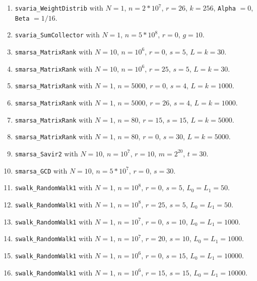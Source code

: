 \begin{enumerate}
  \item {\tt svaria\_WeightDistrib} with $N=1$, $n=2*10^7$, $r=26$, $k=256$,
   {\tt Alpha} $=0$,  {\tt Beta} $=1/16$.

  \item {\tt svaria\_SumCollector} with $N=1$, $n=5*10^8$, $r=0$,  $g=10$.

  \item {\tt smarsa\_MatrixRank} with $N=10$, $n=10^6$, $r=0$,
   $s=5$, $L=k=30$.

  \item {\tt smarsa\_MatrixRank} with $N=10$, $n=10^6$, $r=25$,
   $s=5$, $L=k=30$.

  \item {\tt smarsa\_MatrixRank} with $N=1$, $n=5000$, $r=0$,
   $s=4$, $L=k=1000$.

  \item {\tt smarsa\_MatrixRank} with $N=1$, $n=5000$, $r=26$,
   $s=4$, $L=k=1000$.

  \item {\tt smarsa\_MatrixRank} with $N=1$, $n=80$, $r=15$,
   $s=15$, $L=k=5000$.

  \item {\tt smarsa\_MatrixRank} with $N=1$, $n=80$, $r=0$,
   $s=30$, $L=k=5000$.

  \item {\tt smarsa\_Savir2} with $N=10$, $n=10^7$, $r=10$, $m=2^{20}$, $t=30$.

  \item {\tt smarsa\_GCD} with $N=10$, $n=5*10^7$, $r=0$, $s=30$.

  \item {\tt swalk\_RandomWalk1} with $N=1$, $n=10^8$, $r=0$,
   $s=5$, $L_0=L_1=50$.

  \item {\tt swalk\_RandomWalk1} with $N=1$, $n=10^8$, $r=25$,
   $s=5$, $L_0=L_1=50$.

  \item {\tt swalk\_RandomWalk1} with $N=1$, $n=10^7$, $r=0$,
   $s=10$, $L_0=L_1=1000$.

  \item {\tt swalk\_RandomWalk1} with $N=1$, $n=10^7$, $r=20$,
   $s=10$, $L_0=L_1=1000$.

  \item {\tt swalk\_RandomWalk1} with $N=1$, $n=10^6$, $r=0$,
   $s=15$, $L_0=L_1=10000$.

  \item {\tt swalk\_RandomWalk1} with $N=1$, $n=10^6$, $r=15$,
   $s=15$, $L_0=L_1=10000$.


\end{enumerate}
